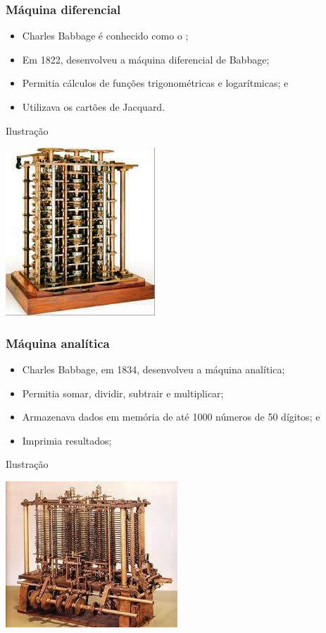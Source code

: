 \documentclass[aspectratio=169]{beamer} %
\begin{document}
\begin{frame}
	\frametitle{Máquina diferencial}
	
	\begin{itemize}
		\item Charles Babbage é conhecido como o ;
		\item Em 1822, desenvolveu a máquina diferencial de Babbage; 
		\item Permitia cálculos de funções trigonométricas e logarítmicas; e 
		\item Utilizava os cartões de Jacquard.
	\end{itemize}\vfill
	
	\begin{exampleblock}{Ilustra\c cão}
		\begin{center}
			\includegraphics[scale=0.5]{img/maquina_diferencial}
		\end{center}
	\end{exampleblock}
\end{frame}

\begin{frame}
	\frametitle{Máquina analítica}
	
	\begin{itemize}
		\item Charles Babbage, em 1834, desenvolveu a máquina analítica;
		\item Permitia somar, dividir, subtrair e multiplicar;
		\item Armazenava dados em memória de até 1000 números de 50 dígitos; e 
		\item Imprimia resultados;
	\end{itemize}\vfill
	
	\begin{exampleblock}{Ilustra\c cão}
		\begin{center}
			\includegraphics[scale=0.5]{img/maquina_analitica}
		\end{center}
	\end{exampleblock}
\end{frame}
\end{document}
